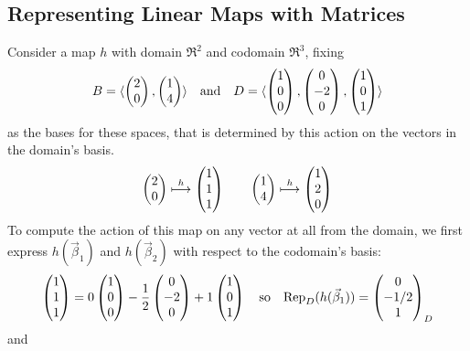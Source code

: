 \subsection{Representing Linear Maps with Matrices}
\begin{example}  \label{ex:TypLinMapRepByMat}
Consider a map $h$ with domain $\Re^2$ and codomain $\Re^3$, fixing 
\begin{equation*}
   B=\sequence{
               \colvec{2 \\ 0},
               \colvec{1 \\ 4}}
   \quad\text{and}\quad
   D=\sequence{
               \colvec{1 \\ 0 \\ 0},
               \colvec{0 \\ -2 \\ 0},
               \colvec{1 \\ 0 \\ 1}}
\end{equation*}
as the bases for these spaces, that is determined by this action
on the vectors in the domain's basis.
\begin{equation*}
  \colvec{2 \\ 0}
    \mapsunder{h}
  \colvec{1 \\ 1 \\ 1}
  \qquad
  \colvec{1 \\ 4}
    \mapsunder{h}
  \colvec{1 \\ 2 \\ 0}
\end{equation*}
To compute the action of this map on any vector at all from the domain,
we first express $h(\vec{\beta}_1)$ and $h(\vec{\beta}_2)$
with respect to the codomain's basis:
\begin{equation*}
  \colvec{1 \\ 1 \\ 1}=
         0\colvec{1 \\ 0 \\ 0}
         -\frac{1}{2}\colvec{0 \\ -2 \\ 0}
         +1\colvec{1 \\ 0 \\ 1}
  \quad\text{so}\quad
   \rep{ h(\vec{\beta}_1) }{D}=\colvec{0 \\ -1/2 \\ 1}_D           
\end{equation*}
and
\begin{equation*}

\end{equation*}
\end{example}

